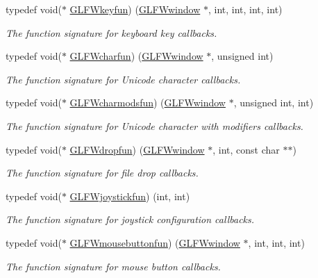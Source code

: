 \begin{DoxyCompactItemize}
typedef void($\ast$ \hyperlink{group__input_ga0192a232a41e4e82948217c8ba94fdfd}{G\+L\+F\+Wkeyfun}) (\hyperlink{group__window_ga3c96d80d363e67d13a41b5d1821f3242}{G\+L\+F\+Wwindow} $\ast$, int, int, int, int)
\begin{DoxyCompactList}\small\item\em The function signature for keyboard key callbacks. \end{DoxyCompactList}\item 
typedef void($\ast$ \hyperlink{group__input_gabf24451c7ceb1952bc02b17a0d5c3e5f}{G\+L\+F\+Wcharfun}) (\hyperlink{group__window_ga3c96d80d363e67d13a41b5d1821f3242}{G\+L\+F\+Wwindow} $\ast$, unsigned int)
\begin{DoxyCompactList}\small\item\em The function signature for Unicode character callbacks. \end{DoxyCompactList}\item 
typedef void($\ast$ \hyperlink{group__input_gae36fb6897d2b7df9b128900c8ce9c507}{G\+L\+F\+Wcharmodsfun}) (\hyperlink{group__window_ga3c96d80d363e67d13a41b5d1821f3242}{G\+L\+F\+Wwindow} $\ast$, unsigned int, int)
\begin{DoxyCompactList}\small\item\em The function signature for Unicode character with modifiers callbacks. \end{DoxyCompactList}\item 
typedef void($\ast$ \hyperlink{group__input_gab71f4ca80b651462852e601caf308c4a}{G\+L\+F\+Wdropfun}) (\hyperlink{group__window_ga3c96d80d363e67d13a41b5d1821f3242}{G\+L\+F\+Wwindow} $\ast$, int, const char $\ast$$\ast$)
\begin{DoxyCompactList}\small\item\em The function signature for file drop callbacks. \end{DoxyCompactList}\item 
typedef void($\ast$ \hyperlink{group__input_gaa67aa597e974298c748bfe4fb17d406d}{G\+L\+F\+Wjoystickfun}) (int, int)
\begin{DoxyCompactList}\small\item\em The function signature for joystick configuration callbacks. \end{DoxyCompactList}\item 
typedef void($\ast$ \hyperlink{group__input_ga39893a4a7e7c3239c98d29c9e084350c}{G\+L\+F\+Wmousebuttonfun}) (\hyperlink{group__window_ga3c96d80d363e67d13a41b5d1821f3242}{G\+L\+F\+Wwindow} $\ast$, int, int, int)
\begin{DoxyCompactList}\small\item\em The function signature for mouse button callbacks. \end{DoxyCompactList}\item 
$$
\end{DoxyCompactItemize}
